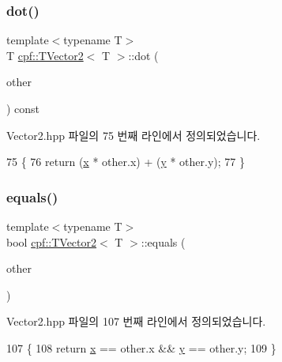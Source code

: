 \subsubsection{\texorpdfstring{dot()}{dot()}}
{\footnotesize\ttfamily template$<$typename T$>$ \\
T \hyperlink{classcpf_1_1_t_vector2}{cpf\+::\+T\+Vector2}$<$ T $>$\+::dot (\begin{DoxyParamCaption}\item[{const \hyperlink{classcpf_1_1_t_vector2}{T\+Vector2}$<$ T $>$ \&}]{other }\end{DoxyParamCaption}) const\hspace{0.3cm}{\ttfamily [inline]}}



Vector2.\+hpp 파일의 75 번째 라인에서 정의되었습니다.


\begin{DoxyCode}
75                                            \{
76             \textcolor{keywordflow}{return} (\hyperlink{classcpf_1_1_t_vector2_a2c0ac9258353351f1435070a2307e9e1}{x} * other.x) + (\hyperlink{classcpf_1_1_t_vector2_a727b923b39a876bbb13c810bcf6eecff}{y} * other.y);
77         \}
\end{DoxyCode}
\mbox{\label{classcpf_1_1_t_vector2_abaaf0150093f6e7d53bf82eb147cd039}} 
\subsubsection{\texorpdfstring{equals()}{equals()}}
{\footnotesize\ttfamily template$<$typename T$>$ \\
bool \hyperlink{classcpf_1_1_t_vector2}{cpf\+::\+T\+Vector2}$<$ T $>$\+::equals (\begin{DoxyParamCaption}\item[{const \hyperlink{classcpf_1_1_t_vector2}{T\+Vector2}$<$ T $>$ \&}]{other }\end{DoxyParamCaption})\hspace{0.3cm}{\ttfamily [inline]}}



Vector2.\+hpp 파일의 107 번째 라인에서 정의되었습니다.


\begin{DoxyCode}
107                                            \{
108             \textcolor{keywordflow}{return} \hyperlink{classcpf_1_1_t_vector2_a2c0ac9258353351f1435070a2307e9e1}{x} == other.x && \hyperlink{classcpf_1_1_t_vector2_a727b923b39a876bbb13c810bcf6eecff}{y} == other.y;
109         \}
\end{DoxyCode}
\mbox{\label{classcpf_1_1_t_vector2_a5b4a7067a062f9d91caf8a792e3dcccf}} 

